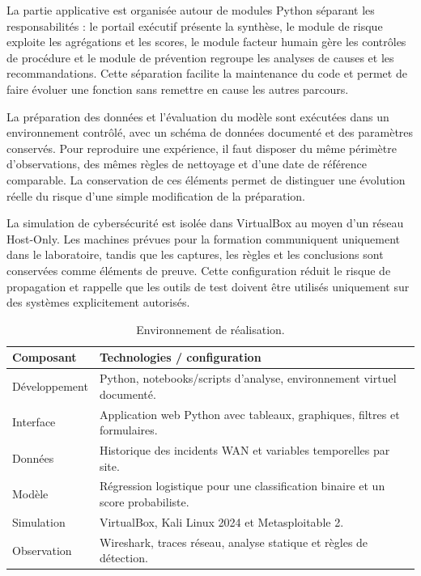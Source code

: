 \documentclass[12pt,a4paper,oneside]{report}
\begin{document}
La partie applicative est organisée autour de modules Python séparant les responsabilités : le portail exécutif présente la synthèse, le module de risque exploite les agrégations et les scores, le module facteur humain gère les contrôles de procédure et le module de prévention regroupe les analyses de causes et les recommandations. Cette séparation facilite la maintenance du code et permet de faire évoluer une fonction sans remettre en cause les autres parcours.

La préparation des données et l’évaluation du modèle sont exécutées dans un environnement contrôlé, avec un schéma de données documenté et des paramètres conservés. Pour reproduire une expérience, il faut disposer du même périmètre d’observations, des mêmes règles de nettoyage et d’une date de référence comparable. La conservation de ces éléments permet de distinguer une évolution réelle du risque d’une simple modification de la préparation.

La simulation de cybersécurité est isolée dans VirtualBox au moyen d’un réseau Host-Only. Les machines prévues pour la formation communiquent uniquement dans le laboratoire, tandis que les captures, les règles et les conclusions sont conservées comme éléments de preuve. Cette configuration réduit le risque de propagation et rappelle que les outils de test doivent être utilisés uniquement sur des systèmes explicitement autorisés.

\begin{table}[H]
\centering
\small
\caption{Environnement de réalisation.}
\begin{tabularx}{\textwidth}{B{4.0cm} X}
\toprule
Composant & Technologies / configuration\\
\midrule
Développement & Python, notebooks/scripts d’analyse, environnement virtuel documenté.\\
Interface & Application web Python avec tableaux, graphiques, filtres et formulaires.\\
Données & Historique des incidents WAN et variables temporelles par site.\\
Modèle & Régression logistique pour une classification binaire et un score probabiliste.\\
Simulation & VirtualBox, Kali Linux 2024 et Metasploitable 2.\\
Observation & Wireshark, traces réseau, analyse statique et règles de détection.\\
\bottomrule
\end{tabularx}
\end{table}
\end{document}
